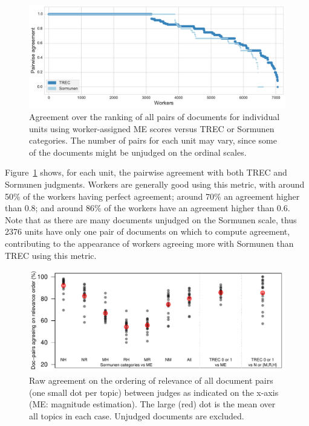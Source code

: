 \begin{figure}[tp]
  \centering
  \includegraphics[width=.9\linewidth]{figs/WorkersQuality.pdf}
  \caption{Agreement over the ranking of all pairs of documents for individual units 
    using worker-assigned ME scores versus
    TREC or Sormunen categories. The number of pairs for each
    unit may vary, since some of the documents might be unjudged on the ordinal scales.
    \label{fig:workersQuality}}
\end{figure}


Figure~\ref{fig:workersQuality} shows, for each unit, the pairwise
agreement with both TREC and Sormunen judgments. 
Workers are generally good using this metric, with 
around 50\% of the workers having perfect agreement; 
around 70\% an agreement higher than $0.8$; and 
around 86\% of the workers have an agreement higher than $0.6$.
Note that as there are many documents unjudged on the Sormunen
scale, thus 2376 units have only one pair of 
documents on which to compute agreement, contributing 
to the appearance 
of workers agreeing more with Sormunen than TREC using this metric.



\begin{figure}[tp]
  \centering
  \includegraphics[width=.75\linewidth]{figs/pairwise5.pdf}
  \vspace{-0.0cm}
  \caption{Raw agreement on the ordering of relevance of all document pairs (one
small dot per topic) between judges as indicated on the x-axis (ME: magnitude
estimation). The large (red) dot is the mean over all topics in each case. 
    Unjudged documents are excluded.
  \label{fig:agreement}
}
\end{figure}

